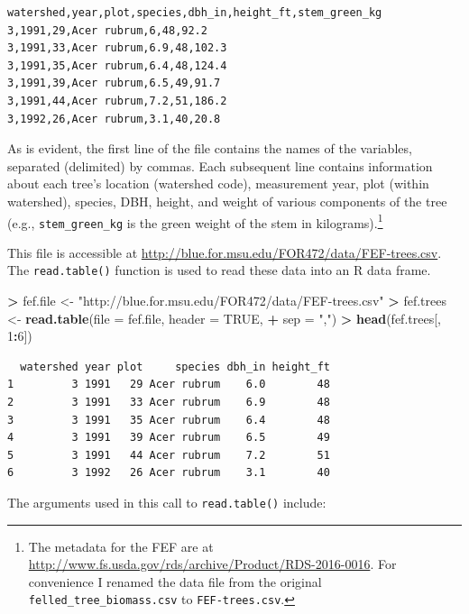 \documentclass[]{krantz}
\makeatletter
\newenvironment{Shaded}{\begin{snugshade}}{\end{snugshade}}
\newcommand{\KeywordTok}[1]{\textcolor[rgb]{0.27,0.27,0.27}{\textbf{#1}}}
\newcommand{\DataTypeTok}[1]{\textcolor[rgb]{0.27,0.27,0.27}{#1}}
\newcommand{\DecValTok}[1]{\textcolor[rgb]{0.06,0.06,0.06}{#1}}
\newcommand{\StringTok}[1]{\textcolor[rgb]{0.5,0.5,0.5}{#1}}
\newcommand{\OtherTok}[1]{\textcolor[rgb]{0.37,0.37,0.37}{#1}}
\newcommand{\OperatorTok}[1]{\textcolor[rgb]{0.43,0.43,0.43}{\textbf{#1}}}
\newcommand{\NormalTok}[1]{#1}
\newenvironment{kframe}{%
\medskip{}
\setlength{\fboxsep}{.8em}
 \def\at@end@of@kframe{}%
 \ifinner\ifhmode%
  \def\at@end@of@kframe{\end{minipage}}%
  \begin{minipage}{\columnwidth}%
 \fi\fi%
 \def\FrameCommand##1{\hskip\@totalleftmargin \hskip-\fboxsep
 \colorbox{shadecolor}{##1}\hskip-\fboxsep
     \hskip-\linewidth \hskip-\@totalleftmargin \hskip\columnwidth}%
 \MakeFramed {\advance\hsize-\width
   \@totalleftmargin\z@ \linewidth\hsize
   \@setminipage}}%
 {\par\unskip\endMakeFramed%
 \at@end@of@kframe}
\renewenvironment{Shaded}{\begin{kframe}}{\end{kframe}}
\theoremstyle{definition}
\theoremstyle{definition}
\theoremstyle{definition}
\theoremstyle{remark}
\makeatother
\begin{document}
\begin{verbatim}
watershed,year,plot,species,dbh_in,height_ft,stem_green_kg
3,1991,29,Acer rubrum,6,48,92.2
3,1991,33,Acer rubrum,6.9,48,102.3
3,1991,35,Acer rubrum,6.4,48,124.4
3,1991,39,Acer rubrum,6.5,49,91.7
3,1991,44,Acer rubrum,7.2,51,186.2
3,1992,26,Acer rubrum,3.1,40,20.8
\end{verbatim}

As is evident, the first line of the file contains the names of the
variables, separated (delimited) by commas. Each subsequent line
contains information about each tree's location (watershed code),
measurement year, plot (within watershed), species, DBH, height, and
weight of various components of the tree (e.g., \texttt{stem\_green\_kg}
is the green weight of the stem in kilograms).\footnote{The metadata for
  the FEF are at
  \url{http://www.fs.usda.gov/rds/archive/Product/RDS-2016-0016}. For
  convenience I renamed the data file from the original
  \texttt{felled\_tree\_biomass.csv} to \texttt{FEF-trees.csv}.}

This file is accessible at
\url{http://blue.for.msu.edu/FOR472/data/FEF-trees.csv}. The
\texttt{read.table()} function is used to read these data into an R data
frame.

\begin{Shaded}
\begin{Highlighting}[]
\OperatorTok{>}\StringTok{ }\NormalTok{fef.file <-}\StringTok{ "http://blue.for.msu.edu/FOR472/data/FEF-trees.csv"}
\OperatorTok{>}\StringTok{ }\NormalTok{fef.trees <-}\StringTok{ }\KeywordTok{read.table}\NormalTok{(}\DataTypeTok{file =}\NormalTok{ fef.file, }\DataTypeTok{header =} \OtherTok{TRUE}\NormalTok{, }
\OperatorTok{+}\StringTok{   }\DataTypeTok{sep =} \StringTok{","}\NormalTok{)}
\OperatorTok{>}\StringTok{ }\KeywordTok{head}\NormalTok{(fef.trees[, }\DecValTok{1}\OperatorTok{:}\DecValTok{6}\NormalTok{])}
\end{Highlighting}
\end{Shaded}

\begin{verbatim}
  watershed year plot     species dbh_in height_ft
1         3 1991   29 Acer rubrum    6.0        48
2         3 1991   33 Acer rubrum    6.9        48
3         3 1991   35 Acer rubrum    6.4        48
4         3 1991   39 Acer rubrum    6.5        49
5         3 1991   44 Acer rubrum    7.2        51
6         3 1992   26 Acer rubrum    3.1        40
\end{verbatim}

The arguments used in this call to \texttt{read.table()} include:
\end{document}
